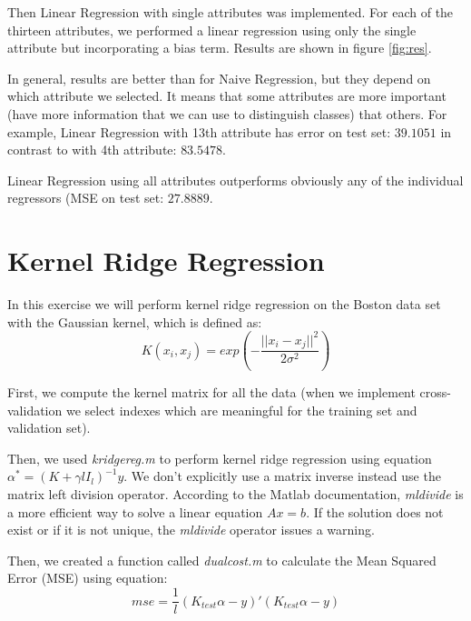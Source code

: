 \documentclass{article} %
\begin{document}
Then Linear Regression with single attributes was implemented. For each of the thirteen attributes, we performed a linear regression using only the single attribute but incorporating a bias term. Results are shown in figure \ref{fig:res}. 

In general, results are better than for Naive Regression, but they depend on which attribute we selected. It means that some attributes are more important (have more information that we can use to distinguish classes) that others. For example, Linear Regression with 13th attribute has error on test set: $39.1051$ in contrast to with 4th attribute: $83.5478$. 

Linear Regression using all attributes outperforms obviously any of the individual regressors (MSE on test set: $27.8889$.


\section{Kernel Ridge Regression}
In this exercise we will perform kernel ridge regression on the Boston data set with the Gaussian kernel, which is defined as:
\begin{equation*}
K(x_i,x_j) = exp(-\frac{|| x_i - x_j||^2}{2 \sigma^2})
\end{equation*}

First, we compute the kernel matrix for all the data (when we implement cross-validation we select indexes which are meaningful for the training set and validation set). 

Then, we used \textit{kridgereg.m} to perform kernel ridge regression using equation $\alpha^* = (K + \gamma l I_l)^{-1}y$. We don't explicitly use a matrix inverse instead use the matrix left division operator. According to the Matlab documentation, \textit{mldivide} is a more efficient way to solve a linear equation $Ax = b$. If the solution does not exist or if it is not unique, the  \textit{mldivide} operator issues a warning.

Then, we created a function called \textit{dualcost.m} to calculate the Mean Squared Error (MSE) using equation:
\begin{equation}
mse = \frac{1}{l}(K_{test} \alpha - y)'(K_{test} \alpha - y)
\end{equation}
\end{document}
